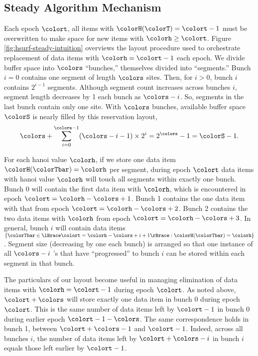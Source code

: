 \subsection{Steady Algorithm Mechanism}
\label{sec:steady-mechanism}



Each epoch $\colort$, all items with $\colorH(\colorT) = \colort - 1$ must be overwritten to make space for new items with \hv{} $\colorh \geq \colort$.
Figure \ref{fig:hsurf-steady-intuition} overviews the layout procedure used to orchestrate replacement of data items with \hv{} $\colorh = \colort - 1$ each epoch.
We divide buffer space into $\colors$ ``bunches,'' themselves divided into ``segments.''
Bunch $i=0$ contains one segment of length $\colors$ sites.
Then, for $i > 0$, bunch $i$ contains $2^{i-1}$ segments.
Although segment count increases across bunches $i$, segment length decreases by 1 each bunch as $\colors - i$.
So, segments in the last bunch contain only one site.
With $\colors$ bunches, available buffer space $\colorS$ is nearly filled by this reservation layout,
\begin{align*}
\colors + \sum_{i=0}^{\colors-1} (\colors - i - 1) \times 2^{i} = 2^{\colors} - 1 = \colorS - 1.
\end{align*}

For each hanoi value $\colorh$, if we store one data item $\colorH(\colorTbar) = \colorh$ per segment, during epoch $\colort$ data items with hanoi value $\colorh$ will touch all segments within exactly one bunch.
Bunch 0 will contain the first data item with \hv{} $\colorh$, which is encountered in epoch $\colort=\colorh - \colors + 1$.
Bunch 1 contains the one data item with that \hv{} from epoch $\colort=\colorh - \colors + 2$.
Bunch 2 contains the two data items with \hv{} $\colorh$ from epoch $\colort=\colorh - \colors + 3$.
In general, bunch $i$ will contain data items $\{ \colorTbar \in \lBrace \colort = \colorh - \colors + i + 1 \rBrace : \colorH(\colorTbar) = \colorh \}$.
Segment size (decreasing by one each bunch) is arranged so that one instance of all $\colors - i$ \hv's that have ``progressed'' to bunch $i$ can be stored within each segment in that bunch.



The particulars of our layout become useful in managing elimination of data items with \hv{} $\colorh = \colort - 1$ during epoch $\colort$.
As noted above, \hv{} $\colort + \colors$ will store exactly one data item in bunch 0 during epoch $\colort$.
This is the same number of data items left by \hv{} $\colort - 1$ in bunch 0 during earlier epoch $\colort - 1 - \colors$.
The same correspondence holds in bunch 1, between \hv{} $\colort + \colors - 1$ and \hv{} $\colort - 1$.
Indeed, across all bunches $i$, the number of data items left by \hv{} $\colort + \colors - i$ in bunch $i$ equals those left earlier by \hv{} $\colort - 1$.

